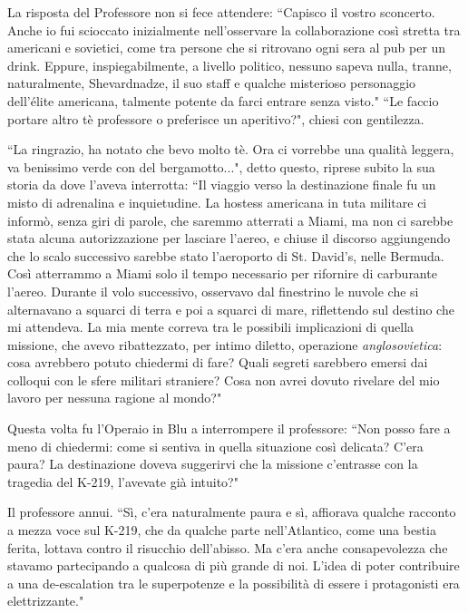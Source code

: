 \documentclass[12pt,b5paper]{article}
\begin{document}
La risposta del Professore non si fece attendere: ``Capisco il vostro sconcerto.
Anche io fui scioccato inizialmente nell'osservare la collaborazione così stretta tra americani e sovietici, come tra persone che si ritrovano ogni sera al
pub per un drink. Eppure, inspiegabilmente, a livello politico, nessuno sapeva nulla, tranne, naturalmente, Shevardnadze, il suo staff e qualche misterioso personaggio dell'élite americana, talmente potente da farci entrare senza visto."
``Le faccio portare altro tè professore o preferisce un aperitivo?", chiesi con
gentilezza. 

``La ringrazio, ha notato che bevo molto tè. Ora ci vorrebbe una qualità leggera,
va benissimo verde con del bergamotto...", detto questo, riprese subito la sua
storia da dove l'aveva interrotta: ``Il viaggio verso la destinazione finale fu un
misto di adrenalina e inquietudine. La hostess americana in tuta militare ci
informò, senza giri di parole, che saremmo atterrati a Miami, ma non ci
sarebbe stata alcuna autorizzazione per lasciare l'aereo, e chiuse il discorso
aggiungendo che lo scalo successivo sarebbe stato l'aeroporto di St. David's,
nelle Bermuda. Così atterrammo a Miami solo il tempo necessario per rifornire
di carburante l'aereo. Durante il volo successivo, osservavo dal finestrino le
nuvole che si alternavano a squarci di terra e poi a squarci di mare, riflettendo sul
destino che mi attendeva. La mia mente correva tra le possibili implicazioni di
quella missione, che avevo ribattezzato, per intimo diletto, operazione
\textit{anglosovietica}: cosa avrebbero potuto chiedermi di fare? Quali segreti sarebbero emersi dai colloqui con le sfere militari straniere? Cosa non avrei
dovuto rivelare del mio lavoro per nessuna ragione al mondo?"

Questa volta fu l'Operaio in Blu a interrompere il professore: ``Non posso fare a
meno di chiedermi: come si sentiva in quella situazione così delicata? C'era paura?
La destinazione doveva suggerirvi che la missione c'entrasse con la tragedia del K-219, l'avevate già intuito?"

Il professore annui. ``Sì, c'era naturalmente paura e sì, affiorava qualche racconto a mezza voce sul K-219, che da qualche parte nell'Atlantico, come una bestia ferita, lottava contro il risucchio dell'abisso. Ma c'era anche consapevolezza che stavamo partecipando a
qualcosa di più grande di noi. L'idea di poter contribuire a una de-escalation tra
le superpotenze e la possibilità di essere i protagonisti era elettrizzante."
\end{document}
